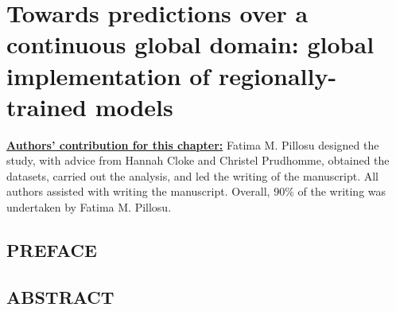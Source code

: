 \ClearShipoutPicture
{}

\chapter{Towards predictions over a continuous global domain: 
global implementation of regionally-trained models}
\label{regional_to_global_training}
\graphicspath{{chapter_07/figures}{chapter_07/tables}}


\underline{\textbf{Authors' contribution for this chapter:}} Fatima M. Pillosu designed the study, with advice from Hannah Cloke and Christel Prudhomme, obtained the datasets, carried out the analysis, and led the writing of the manuscript. All authors assisted with writing the manuscript. Overall, 90\% of the writing was undertaken by Fatima M. Pillosu.

\vspace{\baselineskip}

\section*{PREFACE}



\clearpage

\section*{ABSTRACT}

\clearpage



